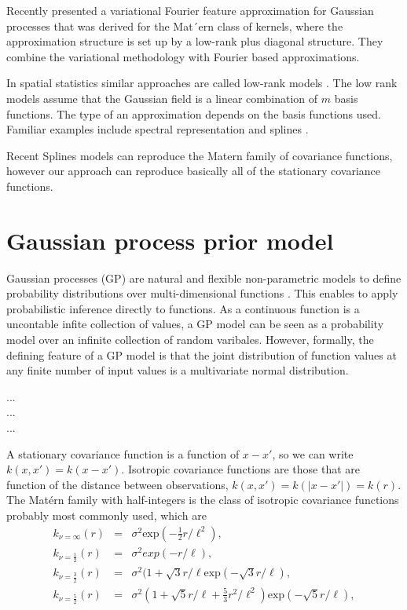 \documentclass[]{interact}
\theoremstyle{plain}%
\theoremstyle{definition}
\theoremstyle{remark}
\begin{document}
Recently \citep{hensman2017variational} presented a variational Fourier feature approximation for Gaussian processes that was derived for the Mat´ern class of kernels, where the approximation structure is set up by a low-rank plus diagonal structure. They combine the variational methodology with Fourier based approximations.

In spatial statistics similar approaches are called low-rank models \citep{diggle2007springer}. The low rank models assume that the Gaussian field is a linear combination of $m$ basis functions. The type of an approximation depends on the basis functions used. Familiar examples include spectral representation \citep{diggle2007springer,paciorek2007computational,paciorek2007bayesian} and splines \citep{wood2003thin}. 

Recent Splines models can reproduce the Matern family of covariance functions, however our approach can reproduce basically all of the stationary covariance functions.


\vspace{3mm}
\section{Gaussian process prior model}

Gaussian processes (GP) are natural and flexible non-parametric models to define probability distributions over multi-dimensional functions \citep{rasmussen2006gaussian;neal1997monte}. This enables to apply probabilistic inference directly to functions. As a continuous function is a uncontable infite collection of values, a GP model can be seen as a probability model over an infinite collection of random varibales. However, formally, the defining feature of a GP model is that the joint distribution of function values at any finite number of input values is a multivariate normal distribution. 

\vspace{0.5cm}
\noindent ... \\
... \\
...


\vspace{0.5cm}
A stationary covariance function is a function of $x-x'$, so we can write $k(x,x') = k(x-x')$. Isotropic covariance functions are those that are function of the distance between observations, $k(x,x') = k(|x-x'|) = k(r)$. The Mat\'ern family with half-integers is the class of isotropic covariance functions probably most commonly used, which are
%
\begin{eqnarray}
k_{\nu=\infty}(r)&=&\sigma^2 \text{exp}(-\frac{1}{2} r/\ell^2), \nonumber \\
k_{\nu=\frac{1}{2}}(r)&=&\sigma^2 exp(-r/\ell), \nonumber \\
k_{\nu=\frac{3}{2}}(r)&=&\sigma^2(1+\sqrt{3}r/\ell \text{exp}(-\sqrt{3}r/\ell), \nonumber \\
k_{\nu=\frac{5}{2}}(r)&=&\sigma^2(1+\sqrt{5}r/\ell+\frac{5}{3}r^2/\ell^2) \text{exp}(-\sqrt{5}r/\ell), \nonumber 
\end{eqnarray}
\end{document}

